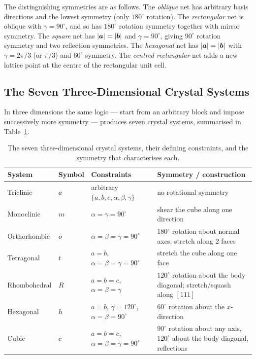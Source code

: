 The distinguishing symmetries are as follows. The \emph{oblique} net has arbitrary basis directions and the lowest symmetry (only $180^\circ$ rotation). The \emph{rectangular} net is oblique with $\gamma = 90^\circ$, and so has $180^\circ$ rotation symmetry together with mirror symmetry. The \emph{square} net has $|\bm{a}| = |\bm{b}|$ and $\gamma=90^\circ$, giving $90^\circ$ rotation symmetry and two reflection symmetries. The \emph{hexagonal} net has $|\bm{a}| = |\bm{b}|$ with $\gamma = 2\pi/3$ (or $\pi/3$) and $60^\circ$ symmetry. The \emph{centred rectangular} net adds a new lattice point at the centre of the rectangular unit cell.

\subsection{The Seven Three-Dimensional Crystal Systems}

In three dimensions the same logic --- start from an arbitrary block and impose successively more symmetry --- produces seven crystal systems, summarised in Table~\ref{tab:xrd-systems}.

\begin{table}[ht]
\centering
\small
\begin{tabular}{@{}ll l p{6.2cm}@{}}
\toprule
System & Symbol & Constraints & Symmetry / construction \\
\midrule
Triclinic & $a$ & arbitrary $\{a,b,c,\alpha,\beta,\gamma\}$ & no rotational symmetry \\
Monoclinic & $m$ & $\alpha = \gamma = 90^\circ$ & shear the cube along one direction \\
Orthorhombic & $o$ & $\alpha=\beta=\gamma=90^\circ$ & $180^\circ$ rotation about normal axes; stretch along $2$ faces \\
Tetragonal & $t$ & $a=b$, $\alpha=\beta=\gamma=90^\circ$ & stretch the cube along one face \\
Rhombohedral & $R$ & $a=b=c$, $\alpha=\beta=\gamma$ & $120^\circ$ rotation about the body diagonal; stretch/squash along $[111]$ \\
Hexagonal & $h$ & $a=b$, $\gamma=120^\circ$, $\alpha=\beta=90^\circ$ & $60^\circ$ rotation about the $x$-direction \\
Cubic & $c$ & $a=b=c$, $\alpha=\beta=\gamma=90^\circ$ & $90^\circ$ rotation about any axis, $120^\circ$ about the body diagonal, reflections \\
\bottomrule
\end{tabular}
\caption{The seven three-dimensional crystal systems, their defining constraints, and the symmetry that characterises each.}
\label{tab:xrd-systems}
\end{table}

